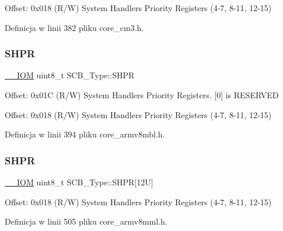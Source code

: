 Offset\+: 0x018 (R/W) System Handlers Priority Registers (4-\/7, 8-\/11, 12-\/15) 

Definicja w linii 382 pliku core\+\_\+cm3.\+h.

\mbox{\label{struct_s_c_b___type_ac6259676cd7892a1b62f3fa7c0930780}} 
\subsubsection{\texorpdfstring{S\+H\+PR}{SHPR}\hspace{0.1cm}{\footnotesize\ttfamily [1/2]}}
{\footnotesize\ttfamily \hyperlink{core__sc300_8h_ab6caba5853a60a17e8e04499b52bf691}{\+\_\+\+\_\+\+I\+OM} uint8\+\_\+t S\+C\+B\+\_\+\+Type\+::\+S\+H\+PR}

Offset\+: 0x01C (R/W) System Handlers Priority Registers. \mbox{[}0\mbox{]} is R\+E\+S\+E\+R\+V\+ED

Offset\+: 0x018 (R/W) System Handlers Priority Registers (4-\/7, 8-\/11, 12-\/15) 

Definicja w linii 394 pliku core\+\_\+armv8mbl.\+h.

\mbox{\label{struct_s_c_b___type_afdab23abd301033bb318c7b188b377db}} 
\subsubsection{\texorpdfstring{S\+H\+PR}{SHPR}\hspace{0.1cm}{\footnotesize\ttfamily [2/2]}}
{\footnotesize\ttfamily \hyperlink{core__sc300_8h_ab6caba5853a60a17e8e04499b52bf691}{\+\_\+\+\_\+\+I\+OM} uint8\+\_\+t S\+C\+B\+\_\+\+Type\+::\+S\+H\+PR\mbox{[}12\+U\mbox{]}}

Offset\+: 0x018 (R/W) System Handlers Priority Registers (4-\/7, 8-\/11, 12-\/15) 

Definicja w linii 505 pliku core\+\_\+armv8mml.\+h.

\mbox{\label{struct_s_c_b___type_ad70825dd0869b7ccd07fb2b8680fcdb6}} 
